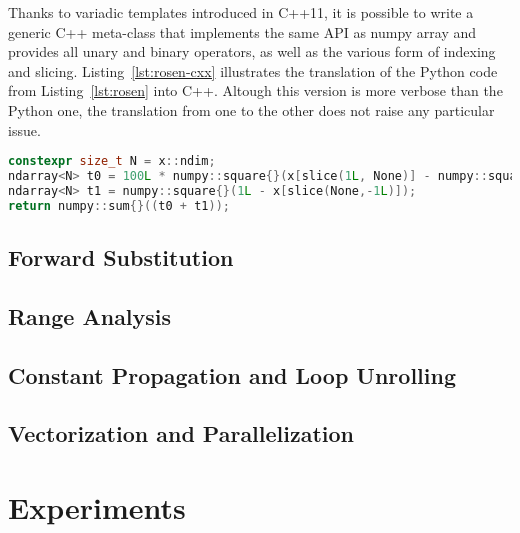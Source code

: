 \documentclass[10pt, preprint]{sigplanconf}
\begin{document}
Thanks to variadic templates introduced in C++11, it is possible to write a
generic C++ meta-class that implements the same API as numpy array and provides
all unary and binary operators, as well as the various form of indexing and
slicing. Listing~\ref{lst:rosen-cxx} illustrates the translation of the Python
code from Listing~\ref{lst:rosen} into C++. Altough this version is more
verbose than the Python one, the translation from one to the other does not
raise any particular issue.

\begin{lstlisting}[language=c++, caption={C++11 translated version of Python version for the rosenbrock kernel.}, label={lst:rosen-cxx}, breaklines=true]
constexpr size_t N = x::ndim;
ndarray<N> t0 = 100L * numpy::square{}(x[slice(1L, None)] - numpy::square{}(x[slice(None,-1L)]));
ndarray<N> t1 = numpy::square{}(1L - x[slice(None,-1L)]);
return numpy::sum{}((t0 + t1));
\end{lstlisting}

\subsection{Forward Substitution}

\subsection{Range Analysis}

\subsection{Constant Propagation and Loop Unrolling}

\subsection{Vectorization and Parallelization}

\cite{esterie2012boost, pyhpc2013, wpmvp2014}

\section{Experiments}
\label{sec:xp}

\end{document}
